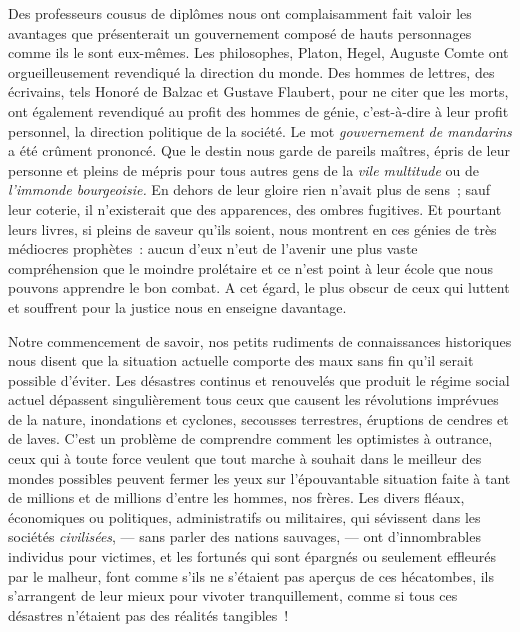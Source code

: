 \documentclass[french,twoside]{book} %
\begin{document}
Des professeurs cousus de diplômes nous ont complaisamment fait valoir les avantages que présenterait un gouvernement composé de hauts personnages comme ils le sont eux-mêmes. Les philosophes, Platon, Hegel, Auguste Comte ont orgueilleusement revendiqué la direction du monde. Des hommes de lettres, des écrivains, tels Honoré de Balzac et Gustave Flaubert, pour ne citer que les morts, ont également revendiqué au profit des hommes de génie, c’est-à-dire à leur profit personnel, la direction politique de la société. Le mot \emph{gouvernement de mandarins} a été crûment prononcé. Que le destin nous  garde de pareils maîtres, épris de leur personne et pleins de mépris pour tous autres gens de la \emph{vile multitude} ou de \emph{l’immonde bourgeoisie.} En dehors de leur gloire rien n’avait plus de sens ; sauf leur coterie, il n’existerait que des apparences, des ombres fugitives. Et pourtant leurs livres, si pleins de saveur qu’ils soient, nous montrent en ces génies de très médiocres prophètes : aucun d’eux n’eut de l’avenir une plus vaste compréhension que le moindre prolétaire et ce n’est point à leur école que nous pouvons apprendre le bon combat. A cet égard, le plus obscur de ceux qui luttent et souffrent pour la justice nous en enseigne davantage.\par
Notre commencement de savoir, nos petits rudiments de connaissances historiques  nous disent que la situation actuelle comporte des maux sans fin qu’il serait possible d’éviter. Les désastres continus et renouvelés que produit le régime social actuel dépassent singulièrement tous ceux que causent les révolutions imprévues de la nature, inondations et cyclones, secousses terrestres, éruptions de cendres et de laves. C’est un problème de comprendre comment les optimistes à outrance, ceux qui à toute force veulent que tout marche à souhait dans le meilleur des mondes possibles peuvent fermer les yeux sur l’épouvantable situation faite à tant de millions et de millions d’entre les hommes, nos frères. Les divers fléaux, économiques ou politiques, administratifs ou militaires, qui sévissent dans les sociétés  \emph{civilisées}, — sans parler des nations sauvages, — ont d’innombrables individus pour victimes, et les fortunés qui sont épargnés ou seulement effleurés par le malheur, font comme s’ils ne s’étaient pas aperçus de ces hécatombes, ils s’arrangent de leur mieux pour vivoter tranquillement, comme si tous ces désastres n’étaient pas des réalités tangibles !\par
\end{document}
